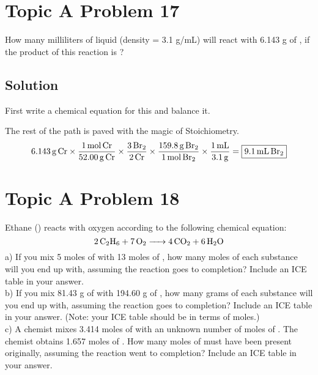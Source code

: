 \documentclass[10pt]{article}
\begin{document}
    \pagebreak
    \section{Topic A Problem 17}
        How many milliliters of liquid  (density = 3.1 g/mL) will react with 6.143 g of , if the product of this reaction is ?

        \subsection{Solution}
            First write a chemical equation for this and balance it.
            \begin{center}
            \end{center}

            The rest of the path is paved with the magic of Stoichiometry.
            \begin{equation}
                6.143\,\unit{\gram}\,\ce{Cr}    \times  \frac{1\,\unit{\mole}\,\ce{Cr}}{52.00\,\unit{\gram}\,\ce{Cr}}
                                                \times  \frac{3\,\ce{Br2}}{2\,\ce{Cr}}
                                                \times  \frac{159.8\,\unit{\gram}\,\ce{Br2}}{1\,\unit{\mole}\,\ce{Br2}}
                                                \times  \frac{1\,\unit{\milli\liter}}{3.1\,\unit{\gram}}
                    =   \boxed{9.1\,\unit{\milli\liter}\,\ce{Br2}}
            \end{equation}

    \pagebreak
    \section{Topic A Problem 18}
        Ethane () reacts with oxygen according to the following chemical equation:
        \begin{equation}
            \ce{2 C2H6 + 7 O2 -> 4 CO2 + 6 H2O}
        \end{equation}
        a) If you mix 5 moles of  with 13 moles of , how many moles of each substance will you end up with, assuming the reaction goes to completion? 
        Include an ICE table in your answer.\\
        b) If you mix 81.43 g of  with 194.60 g of , how many grams of each substance will you end up with, assuming the reaction goes to completion? 
        Include an ICE table in your answer. 
        (Note: your ICE table should be in terms of moles.)\\
        c) A chemist mixes 3.414 moles of  with an unknown number of moles of . 
        The chemist obtains 1.657 moles of . 
        How many moles of  must have been present originally, assuming the reaction went to completion? 
        Include an ICE table in your answer.
\end{document}
